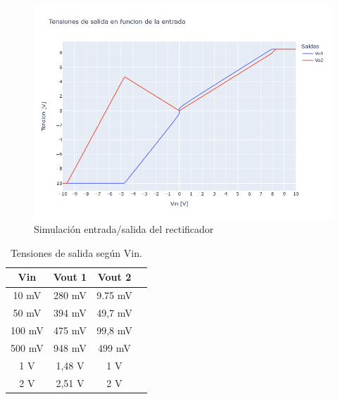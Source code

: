\begin{figure}[H]
    \centering
    \includegraphics[width=0.9\linewidth]{Secciones/Circuito3/TP1_3_Vo1_Vo2_vs_Vin.png}
    \caption{Simulación entrada/salida del rectificador}
    \label{fig:TP1_3_Vo1_Vo2_vs_Vin}
\end{figure}

\begin{table}[h!]
\centering
\begin{tabular}{|c||c|c|c|}
\hline
\textbf{Vin} & \textbf{Vout 1} & \textbf{Vout 2} \\ \hline
10 mV    & 280 mV  & 9.75 mV  \\ \hline
50 mV   & 394 mV  & 49,7 mV    \\ \hline
100 mV   & 475 mV   & 99,8 mV   \\ \hline
500 mV   & 948 mV & 499 mV  \\ \hline
1 V   & 1,48 V & 1 V  \\ \hline
2 V   & 2,51 V & 2 V    \\ \hline
\end{tabular}
\caption{Tensiones de salida según Vin.}
\label{tab:TP1_3_Vo1_Vo2_vs_Vin}
\end{table}






